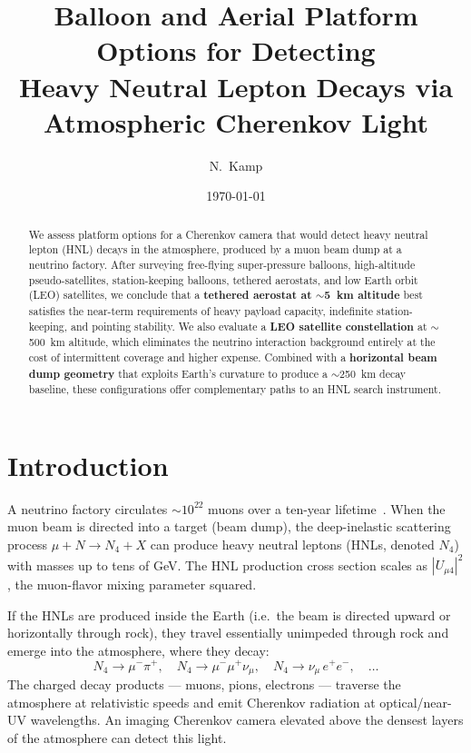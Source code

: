 \documentclass[11pt]{article}
\title{Balloon and Aerial Platform Options for Detecting\\
Heavy Neutral Lepton Decays via Atmospheric Cherenkov Light}
\author{N.\ Kamp}
\date{\today}
\begin{document}
\maketitle

\begin{abstract}
We assess platform options for a Cherenkov camera that would detect
heavy neutral lepton (HNL) decays in the atmosphere, produced by a muon beam
dump at a neutrino factory.  After surveying free-flying super-pressure
balloons, high-altitude pseudo-satellites, station-keeping balloons,
tethered aerostats, and low Earth orbit (LEO) satellites, we conclude that a
\textbf{tethered aerostat at $\sim$5~km altitude} best satisfies the
near-term requirements of heavy payload capacity, indefinite
station-keeping, and pointing stability.  We also evaluate a
\textbf{LEO satellite constellation} at $\sim$500~km altitude, which
eliminates the neutrino interaction background entirely at the cost of
intermittent coverage and higher expense.  Combined with a
\textbf{horizontal beam dump geometry} that exploits Earth's curvature to
produce a $\sim$250~km decay baseline, these configurations offer
complementary paths to an HNL search instrument.
\end{abstract}

\tableofcontents

\section{Introduction}
\label{sec:intro}

A neutrino factory circulates $\sim 10^{22}$ muons over a ten-year
lifetime~\cite{IDS-NF}.  When the muon beam is directed into a target
(beam dump), the deep-inelastic scattering process $\mu + N \to N_4 + X$
can produce heavy neutral leptons (HNLs, denoted $N_4$) with masses up to
tens of GeV.  The HNL production cross section scales as $|U_{\mu4}|^2$,
the muon-flavor mixing parameter squared.

If the HNLs are produced inside the Earth (i.e.\ the beam is directed
upward or horizontally through rock), they travel essentially unimpeded
through rock and emerge into the atmosphere, where they decay:
\begin{equation}
  N_4 \to \mu^- \pi^+,\quad
  N_4 \to \mu^- \mu^+ \nu_\mu,\quad
  N_4 \to \nu_\mu\, e^+ e^-,\quad \ldots
\end{equation}
The charged decay products --- muons, pions, electrons --- traverse
the atmosphere at relativistic speeds and emit Cherenkov radiation at
optical/near-UV wavelengths.  An imaging Cherenkov camera elevated above
the densest layers of the atmosphere can detect this light.
\end{document}
